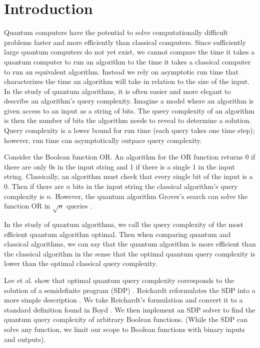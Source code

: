 \section{Introduction}

Quantum computers have the potential to 
solve computationally difficult problems
faster and more efficiently than classical computers.
Since sufficiently large quantum computers do not yet exist,
we cannot compare the time it takes a quantum computer
to run an algorithm to the time it takes a classical computer
to run an equivalent algorithm.
Instead we rely on asymptotic run time that 
characterizes the time an algorithm will take in relation
to the size of the input.
In the study of quantum algorithms, it is often easier
and more elegant to describe an algorithm's query complexity.
Imagine a model where an algorithm is given access
to an input as a string of bits.
The query complexity of an algorithm is then the number
of bits the algorithm needs to reveal to determine a solution.
Query complexity is a lower bound for run time
(each query takes one time step);
however, run time can asymptotically outpace query complexity.

Consider the Boolean function OR.
An algorithm for the OR function returns 0 if
there are only 0s in the input string
and 1 if there is a single 1 in the input string.
Classically, an algorithm must check that
every single bit of the input is a 0.
Then if there are $n$ bits in the input string
the classical algorithm's query complexity is $n$.
However, the quantum algorithm Grover's search
can solve the function OR in $\sqrt{n}$ queries \cite{grover1996fast}.

In the study of quantum algorithms,
we call the query complexity of the most efficient quantum
algorithm optimal.
Then when comparing quantum and classical algorithms,
we can say that the quantum algorithm is more
efficient than the classical algorithm in the sense
that the optimal quantum query complexity
is lower than the optimal classical query complexity.

Lee et al. show that optimal quantum query complexity
corresponds to the solution of a semidefinite program (SDP)
\cite{lee2011quantum}.
Reichardt reformulates the SDP into a more simple description 
\cite{reichardt2009span}.
We take Reichardt's formulation and convert it
to a standard definition found in Boyd \cite{boyd2004convex}.
We then implement an SDP solver to find the
quantum query complexity of arbitrary Boolean functions.
(While the SDP can solve any function,
we limit our scope to Boolean functions with
binary inputs and outputs).

